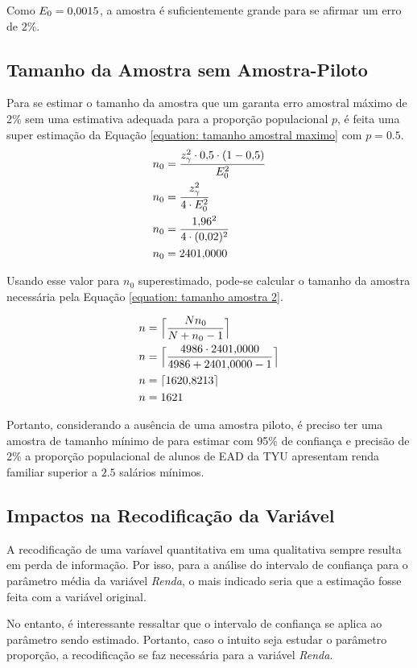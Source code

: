 	Como $E_0 = \num{0.0015}$, a amostra é suficientemente grande para se afirmar
	um erro de $2\%$.

\subsection{Tamanho da Amostra sem Amostra-Piloto}

	Para se estimar o tamanho da amostra que um garanta erro amostral máximo de
	2\% sem uma estimativa adequada para a proporção populacional $p$, é
	feita uma super estimação da Equação \ref{equation: tamanho amostral
	maximo} com $p = 0.5$.
	\begin{align*}
		n_0 &= \frac{z_\gamma^2 \cdot \num{0.5} \cdot (1 - \num{0.5})}{E_0^2} \\
		n_0 &= \frac{z_\gamma^2}{4 \cdot E_0^2} \\
		n_0 &= \frac{\num{1.96}^2}{4 \cdot (\num{0.02})^2} \\
		n_0 &= \num{2401.0000}
	\end{align*}

	Usando esse valor para $n_0$ superestimado, pode-se calcular o tamanho da
	amostra necessária pela Equação \ref{equation: tamanho amostra 2}.

	\begin{align*}
		n &= \Big\lceil \frac{N n_0}{N + n_0 - 1} \Big\rceil \\
		n &= \Big\lceil \frac{4986 \cdot \num{2401.0000}}{4986 + \num{2401.0000} - 1} \Big\rceil \\
		n &= \lceil \num{1620.8213} \rceil \\
		n &= 1621
	\end{align*}

	Portanto, considerando a ausência de uma amostra piloto, é preciso ter uma
	amostra de tamanho mínimo de \SEISCnceil para estimar com 95\% de
	confiança e precisão de 2\% a proporção populacional de alunos de EAD da TYU
	apresentam renda familiar superior a $\num{2,5}$ salários mínimos.

\subsection{Impactos na Recodificação da Variável}
	
	A recodificação de uma varíavel quantitativa em uma qualitativa sempre
	resulta em perda de informação. Por isso, para a análise do intervalo de
	confiança para o parâmetro média da variável \textit{Renda}, o mais
	indicado seria que a estimação fosse feita com a variável original.

	No entanto, é interessante ressaltar que o intervalo de confiança se
	aplica ao parâmetro sendo estimado. Portanto, caso o intuito seja
	estudar o parâmetro proporção, a recodificação se faz necessária para a
	variável \textit{Renda}.
